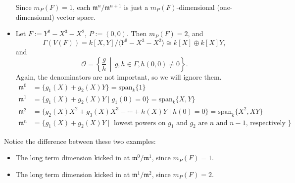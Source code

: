 \documentclass[12pt]{article}
\newcommand{\vbrack}[1]{\langle #1\rangle}
\theoremstyle{definition}
\begin{document}
\begin{itemize}
    Since $m_P(F)=1$, each $\mathfrak{m}^n/\mathfrak{m}^{n+1}$ is just a $m_P(F)$-dimensional (one-dimensional) vector space.
    \item Let $F:=Y^2-X^3-X^2$, $P:=(0,0)$. Then $m_P(F)=2$, and 
    \[\Gamma(V(F))=k[X,Y]/\vbrack{Y^2-X^3-X^2}\cong k[X]\oplus k[X]Y,\]
    and
    \[\mathcal{O}=\left\{\frac{g}{h}\,\middle|\,g,h\in\Gamma,h(0,0)\neq0\right\}.\]
    Again, the denominators are not important, so we will ignore them.
    \begin{align*}
        \mathfrak{m}^0&=\{g_1(X)+g_2(X)Y\}=\mathrm{span}_k\{1\}\\
        \mathfrak{m}^1&=\{g_1(X)+g_2(X)Y\mid g_1(0)=0\}=\mathrm{span}_k\{X,Y\}\\
        \mathfrak{m}^2&=\{g_2(X)X^2+g_3(X)X^3+\dotsb+h(X)Y\mid h(0)=0\}=\mathrm{span}_k\{X^2,XY\}\\
        \mathfrak{m}^n&=\{g_1(X)+g_2(X)Y\mid\text{ lowest powers on }g_1\text{ and }g_2\text{ are }n\text{ and }n-1\text{, respectively }\}
    \end{align*}
\end{itemize}
Notice the difference between these two examples:
\begin{itemize}
    \item The long term dimension kicked in at $\mathfrak{m}^0/\mathfrak{m}^1$, since $m_P(F)=1$.
    \item The long term dimension kicked in at $\mathfrak{m}^1/\mathfrak{m}^2$, since $m_P(F)=2$.
\end{itemize}
\end{document}
